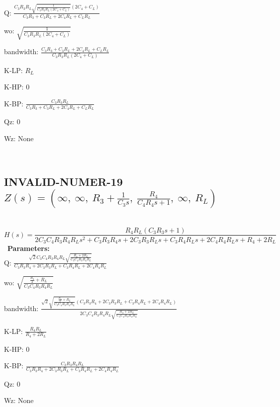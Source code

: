 \documentclass{article}
\begin{document}
Q: $\frac{C_{3} R_{3} R_{L} \sqrt{\frac{1}{C_{3} R_{3} R_{L} \left(2 C_{4} + C_{L}\right)}} \left(2 C_{4} + C_{L}\right)}{C_{3} R_{3} + C_{3} R_{L} + 2 C_{4} R_{L} + C_{L} R_{L}}$\ 

wo: $\sqrt{\frac{1}{C_{3} R_{3} R_{L} \left(2 C_{4} + C_{L}\right)}}$\ 

bandwidth: $\frac{C_{3} R_{3} + C_{3} R_{L} + 2 C_{4} R_{L} + C_{L} R_{L}}{C_{3} R_{3} R_{L} \left(2 C_{4} + C_{L}\right)}$\ 

K-LP: $R_{L}$\ 

K-HP: $0$\ 

K-BP: $\frac{C_{3} R_{3} R_{L}}{C_{3} R_{3} + C_{3} R_{L} + 2 C_{4} R_{L} + C_{L} R_{L}}$\ 

Qz: $0$\ 

Wz: $\text{None}$\ 

\ 

\subsection{INVALID-NUMER-19 $Z(s) = \left( \infty, \  \infty, \  R_{3} + \frac{1}{C_{3} s}, \  \frac{R_{4}}{C_{4} R_{4} s + 1}, \  \infty, \  R_{L}\right)$ } \ 
\textbf{\[H(s) = \frac{R_{4} R_{L} \left(C_{3} R_{3} s + 1\right)}{2 C_{3} C_{4} R_{3} R_{4} R_{L} s^{2} + C_{3} R_{3} R_{4} s + 2 C_{3} R_{3} R_{L} s + C_{3} R_{4} R_{L} s + 2 C_{4} R_{4} R_{L} s + R_{4} + 2 R_{L}}\] } \ 
\textbf{Parameters:}\\ 

Q: $\frac{\sqrt{2} C_{3} C_{4} R_{3} R_{4} R_{L} \sqrt{\frac{R_{4} + 2 R_{L}}{C_{3} C_{4} R_{3} R_{4} R_{L}}}}{C_{3} R_{3} R_{4} + 2 C_{3} R_{3} R_{L} + C_{3} R_{4} R_{L} + 2 C_{4} R_{4} R_{L}}$\ 

wo: $\sqrt{\frac{\frac{R_{4}}{2} + R_{L}}{C_{3} C_{4} R_{3} R_{4} R_{L}}}$\ 

bandwidth: $\frac{\sqrt{2} \sqrt{\frac{\frac{R_{4}}{2} + R_{L}}{C_{3} C_{4} R_{3} R_{4} R_{L}}} \left(C_{3} R_{3} R_{4} + 2 C_{3} R_{3} R_{L} + C_{3} R_{4} R_{L} + 2 C_{4} R_{4} R_{L}\right)}{2 C_{3} C_{4} R_{3} R_{4} R_{L} \sqrt{\frac{R_{4} + 2 R_{L}}{C_{3} C_{4} R_{3} R_{4} R_{L}}}}$\ 

K-LP: $\frac{R_{4} R_{L}}{R_{4} + 2 R_{L}}$\ 

K-HP: $0$\ 

K-BP: $\frac{C_{3} R_{3} R_{4} R_{L}}{C_{3} R_{3} R_{4} + 2 C_{3} R_{3} R_{L} + C_{3} R_{4} R_{L} + 2 C_{4} R_{4} R_{L}}$\ 

Qz: $0$\ 

Wz: $\text{None}$\ 
\end{document}
